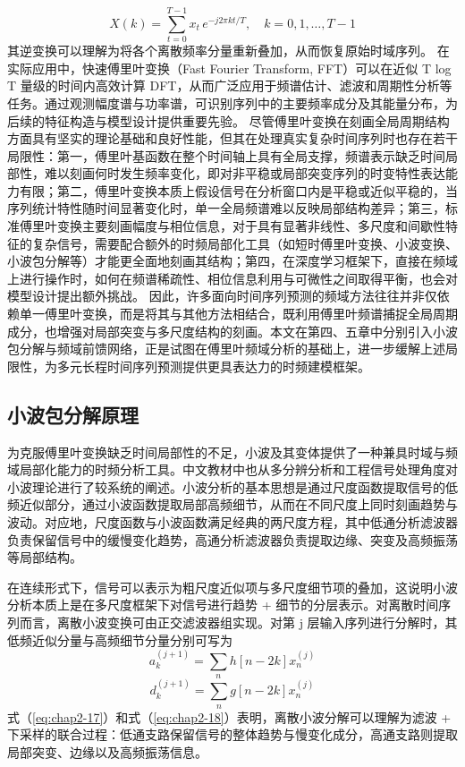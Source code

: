 \begin{equation}
X(k) = \sum_{t=0}^{T-1} x_t\, e^{-j 2\pi kt / T}, \quad k = 0,1,\dots,T-1
\label{eq:chap2-12}
\end{equation}
其逆变换可以理解为将各个离散频率分量重新叠加，从而恢复原始时域序列。
在实际应用中，快速傅里叶变换（Fast Fourier Transform, FFT）可以在近似 T log T 量级的时间内高效计算 DFT，从而广泛应用于频谱估计、滤波和周期性分析等任务\cite{cooley1965algorithm}。通过观测幅度谱与功率谱，可识别序列中的主要频率成分及其能量分布，为后续的特征构造与模型设计提供重要先验。 尽管傅里叶变换在刻画全局周期结构方面具有坚实的理论基础和良好性能，但其在处理真实复杂时间序列时也存在若干局限性：第一，傅里叶基函数在整个时间轴上具有全局支撑，频谱表示缺乏时间局部性，难以刻画何时发生频率变化，即对非平稳或局部突变序列的时变特性表达能力有限；第二，傅里叶变换本质上假设信号在分析窗口内是平稳或近似平稳的，当序列统计特性随时间显著变化时，单一全局频谱难以反映局部结构差异；第三，标准傅里叶变换主要刻画幅度与相位信息，对于具有显著非线性、多尺度和间歇性特征的复杂信号，需要配合额外的时频局部化工具（如短时傅里叶变换、小波变换、小波包分解等）才能更全面地刻画其结构；第四，在深度学习框架下，直接在频域上进行操作时，如何在频谱稀疏性、相位信息利用与可微性之间取得平衡，也会对模型设计提出额外挑战。 因此，许多面向时间序列预测的频域方法往往并非仅依赖单一傅里叶变换，而是将其与其他方法相结合，既利用傅里叶频谱捕捉全局周期成分，也增强对局部突变与多尺度结构的刻画。本文在第四、五章中分别引入小波包分解与频域前馈网络，正是试图在傅里叶频域分析的基础上，进一步缓解上述局限性，为多元长程时间序列预测提供更具表达力的时频建模框架。
\subsection{小波包分解原理} 为克服傅里叶变换缺乏时间局部性的不足，小波及其变体提供了一种兼具时域与频域局部化能力的时频分析工具。中文教材中也从多分辨分析和工程信号处理角度对小波理论进行了较系统的阐述\cite{fan2008wavelet}。小波分析的基本思想是通过尺度函数提取信号的低频近似部分，通过小波函数提取局部高频细节，从而在不同尺度上同时刻画趋势与波动。对应地，尺度函数与小波函数满足经典的两尺度方程，其中低通分析滤波器负责保留信号中的缓慢变化趋势，高通分析滤波器负责提取边缘、突变及高频振荡等局部结构。

在连续形式下，信号可以表示为粗尺度近似项与多尺度细节项的叠加，这说明小波分析本质上是在多尺度框架下对信号进行趋势 + 细节的分层表示。对离散时间序列而言，离散小波变换可由正交滤波器组实现。对第 j 层输入序列进行分解时，其低频近似分量与高频细节分量分别可写为
\begin{equation}
a_k^{(j+1)}=\sum_{n} h[n-2k]x_n^{(j)}
\label{eq:chap2-17}
\end{equation}
\begin{equation}
d_k^{(j+1)}=\sum_{n} g[n-2k]x_n^{(j)}
\label{eq:chap2-18}
\end{equation}
式（\ref{eq:chap2-17}）和式（\ref{eq:chap2-18}）表明，离散小波分解可以理解为滤波 + 下采样的联合过程：低通支路保留信号的整体趋势与慢变化成分，高通支路则提取局部突变、边缘以及高频振荡信息。

